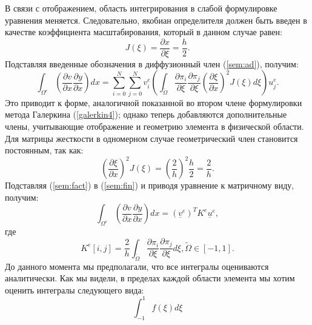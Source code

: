 %
В связи с отображением, область интегрирования в слабой формулировке уравнения меняется. 
%
Следовательно, якобиан определителя должен быть введен в качестве коэффициента масштабирования, 
который в данном случае равен:
%
\begin{equation*}
    J(\xi) = \frac{\partial x}{\partial \xi} = \frac{h}{2}.
\end{equation*}
%
Подставляя введенные обозначения в диффузионный член (\ref{sem:ad}), получим:
%
\begin{equation}\label{sem:fin}
    \int_{\Omega^e} (\frac{\partial v}{\partial x} \frac{\partial y}{\partial x})dx =
    \sum^N_{i=0} \sum^N_{j=0} v^e_i (\int_{\widetilde{\Omega}} \frac{\partial \pi_i}{\partial \xi} 
    \frac{\partial \pi_j}{\partial \xi} (\frac{\partial \xi}{\partial x})^2 J(\xi) d\xi)u^e_j.
\end{equation}
%
Это приводит к форме, аналогичной показанной во втором члене формулировки метода Галеркина (\ref{galerkin4}); 
однако теперь добавляются дополнительные члены, учитывающие отображение и геометрию элемента в физической области. 
%
Для матрицы жесткости в одномерном случае геометрический член становится постоянным, так как:
%
\begin{equation}\label{sem:fact}
    (\frac{\partial \xi}{\partial x})^2 J(\xi) = (\frac{2}{h})^2 \frac{h}{2} = \frac{2}{h}.
\end{equation}
%
Подставляя (\ref{sem:fact}) в (\ref{sem:fin}) и приводя уравнение к матричному виду, получим:
%
\begin{equation}\label{sem:matrix}
    \int_{\Omega^e} (\frac{\partial v}{\partial x} \frac{\partial y}{\partial x})dx =
    (\underline{v}^e)^T K^e \underline{u}^e,
\end{equation}
%
где
%
\begin{equation*}
    K^e[i,j] = \frac{2}{h} \int_{\widetilde{\Omega}} \frac{\partial \pi_i}{\partial \xi}
    \frac{\partial \pi_j}{\partial \xi} d\xi, \widetilde{\Omega} \in [-1,1].
\end{equation*}
%
До данного момента мы предполагали, что все интегралы оцениваются аналитически. 
%
Как мы видели, в пределах каждой области элемента мы хотим оценить интегралы следующего вида:
%
\begin{equation*}
   \int^1_{-1} f(\xi) d\xi
\end{equation*}
%

